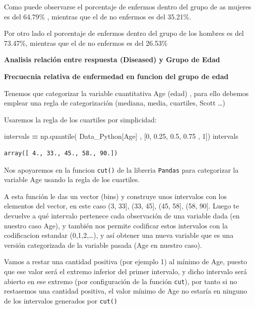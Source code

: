 \documentclass[
  11pt,
  a4paper,
]{article}
\newenvironment{Shaded}{\begin{snugshade}}{\end{snugshade}}
\newcommand{\DecValTok}[1]{\textcolor[rgb]{0.00,0.00,0.81}{#1}}
\newcommand{\FloatTok}[1]{\textcolor[rgb]{0.00,0.00,0.81}{#1}}
\newcommand{\NormalTok}[1]{#1}
\newcommand{\OperatorTok}[1]{\textcolor[rgb]{0.81,0.36,0.00}{\textbf{#1}}}
\newcommand{\StringTok}[1]{\textcolor[rgb]{0.31,0.60,0.02}{#1}}
\begin{document}
Como puede observarse el porcentaje de enfermos dentro del grupo de as
mujeres es del 64.79\% , mientras que el de no enfermos es del 35.21\%.

Por otro lado el porcentaje de enfermos dentro del grupo de los hombres
es del 73.47\%, mientras que el de no enfermos es del 26.53\%

\newpage

\textbf{Analisis relación entre respuesta (Diseased) y Grupo de Edad}

\vspace{0.25cm}

\textbf{Frecuecnia relativa de enfermedad en funcion del grupo de edad}

Tenemos que categorizar la variable cuantitativa Age (edad) , para ello
debemos emplear una regla de categorización (mediana, media, cuartiles,
Scott \ldots)

Usaremos la regla de los cuartiles por simplicidad:

\begin{Shaded}
\begin{Highlighting}[]
\NormalTok{intervals }\OperatorTok{=}\NormalTok{ np.quantile( Data\_Python[}\StringTok{\textquotesingle{}Age\textquotesingle{}}\NormalTok{] , [}\DecValTok{0}\NormalTok{, }\FloatTok{0.25}\NormalTok{, }\FloatTok{0.5}\NormalTok{, }\FloatTok{0.75}\NormalTok{ , }\DecValTok{1}\NormalTok{])}
\NormalTok{intervals}
\end{Highlighting}
\end{Shaded}

\begin{verbatim}
array([ 4., 33., 45., 58., 90.])
\end{verbatim}

Nos apoyaremos en la funcion \texttt{cut()} de la libreria
\texttt{Pandas} para categorizar la variable Age usando la regla de los
cuartiles.

A esta función le das un vector (bins) y construye unos intervalos con
los elementos del vector, en este caso (3, 33{]}, (33, 45{]}, (45,
58{]}, (58, 90{]}. Luego te devuelve a qué intervalo pertenece cada
observación de una variable dada (en nuestro caso Age), y también nos
permite codificar estos intervalos con la codificacion estandar
(0,1,2,\ldots), y así obtener una nueva variable que es una versión
categorizada de la variable pasada (Age en nuestro caso).

Vamos a restar una cantidad positiva (por ejemplo 1) al mínimo de Age,
puesto que ese valor será el extremo inferior del primer intervalo, y
dicho intervalo será abierto en ese extremo (por configuración de la
función \texttt{cut}), por tanto si no restasemos una cantidad positiva,
el valor mínimo de Age no estaría en ninguno de los intervalos generados
por \texttt{cut()}
\end{document}
